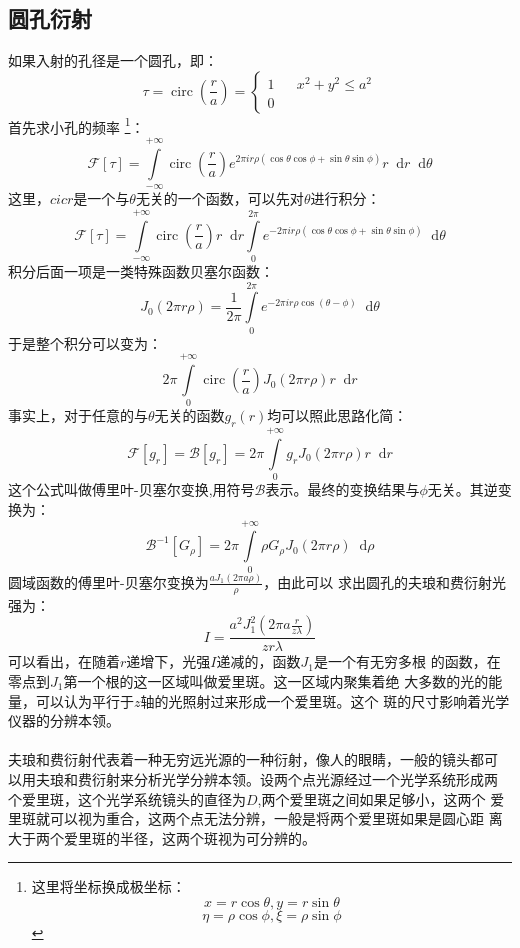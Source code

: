 \documentclass{article}
\DeclareMathOperator{\cir}{circ}
\newcommand*{\dif}{\mathop{}\!\mathrm{d}}
\begin{document}
\subsection{圆孔衍射}
如果入射的孔径是一个圆孔，即：
\[
  \tau=\cir(\frac{r}{a})=\left \{
    \begin{array}{rcl}
      1&&x^2+y^2\leq a^2\\
      0&&{}
    \end{array}
  \right
  .
\]
首先求小孔的频率
\footnote{
  这里将坐标换成极坐标：
  \[x=r\cos{\theta},y=r\sin{\theta}\]
  \[\eta=\rho\cos{\phi},\xi=\rho\sin{\phi}\]}：
\[\mathscr{F}[\tau]=\int\limits_{-\infty}^{+\infty}\cir(\frac{r}{a})e^{2\pi
    ir\rho(\cos{\theta}\cos{\phi}+\sin{\theta}\sin{\phi})}r\dif
  r\dif\theta\]
这里，$cicr$是一个与$\theta$无关的一个函数，可以先对$\theta$进行积分：
\[\mathscr{F}[\tau]=\int\limits_{-\infty}^{+\infty}\cir(\frac{r}{a})r\dif
  r \int\limits_{0}^{2\pi}e^{-2\pi i
    r\rho(\cos{\theta}\cos{\phi}+\sin{\theta}\sin{\phi})}\dif\theta\]
积分后面一项是一类特殊函数贝塞尔函数：
\[J_0(2\pi r\rho)=\frac{1}{2\pi}\int\limits_{0}^{2\pi}e^{-2\pi i
    r\rho\cos(\theta-\phi)}\dif \theta\]
于是整个积分可以变为：
\[2\pi\int\limits_{0}^{+\infty} \cir(\frac{r}{a})J_0(2\pi
  r\rho)r\dif r\]
事实上，对于任意的与$\theta$无关的函数$g_r(r)$均可以照此思路化简：
\begin{equation}
  \label{eq:8}
  \mathscr{F}[g_r]=\mathscr{B}[g_r]=2\pi\int\limits_{0}^{+\infty}g_rJ_0(2\pi
  r\rho)r\dif r
\end{equation}
这个公式叫做傅里叶-贝塞尔变换,用符号$\mathscr{B}$表示。最终的变换结果与$\phi$无关。其逆变换为：
\begin{equation}
  \label{eq:9}
  \mathscr{B}^{-1}[G_\rho]=2\pi \int\limits_0^{+\infty}\rho
  G_{\rho}J_0(2\pi r\rho)\dif \rho
\end{equation}
圆域函数的傅里叶-贝塞尔变换为$\frac{aJ_1(2\pi a\rho)}{\rho}$，由此可以
求出圆孔的夫琅和费衍射光强为：
\[I=\frac{a^2J_1^2(2\pi a \frac{r}{z\lambda})}{zr\lambda}\]
可以看出，在随着$r$递增下，光强$I$递减的，函数$J_1$是一个有无穷多根
的函数，在零点到$J_1$第一个根的这一区域叫做爱里斑。这一区域内聚集着绝
大多数的光的能量，可以认为平行于$z$轴的光照射过来形成一个爱里斑。这个
斑的尺寸影响着光学仪器的分辨本领。
\paragraph{}
夫琅和费衍射代表着一种无穷远光源的一种衍射，像人的眼睛，一般的镜头都可
以用夫琅和费衍射来分析光学分辨本领。设两个点光源经过一个光学系统形成两
个爱里斑，这个光学系统镜头的直径为$D$,两个爱里斑之间如果足够小，这两个
爱里斑就可以视为重合，这两个点无法分辨，一般是将两个爱里斑如果是圆心距
离大于两个爱里斑的半径，这两个斑视为可分辨的。
\end{document}
